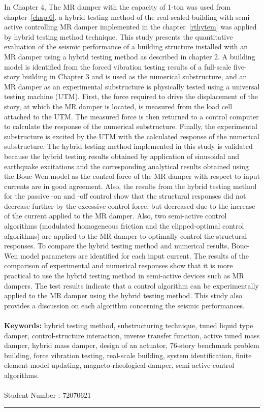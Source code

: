 In Chapter 4, The MR damper with the capacity of 1-ton was used from chapter~\ref{chap:6}, a hybrid testing method of the real-scaled building with semi-active controlling MR damper implemented in the chapter~\ref{rthytem} was applied by hybrid testing method technique. This study presents the quantitative evaluation of the seismic performance of a building structure installed with an MR damper using a hybrid testing method as described in chapter 2. A building model is identified from the forced vibration testing results of a full-scale five-story building in Chapter 3 and is used as the numerical substructure, and an MR damper as an experimental substructure is physically tested using a universal testing machine (UTM). First, the force required to drive the displacement of the story, at which the MR damper is located, is measured from the load cell attached to the UTM. The measured force is then returned to a control computer to calculate the response of the numerical substructure. Finally, the experimental substructure is excited by the UTM with the calculated response of the numerical substructure. The hybrid testing method implemented in this study is validated because the hybrid testing results obtained by application of sinusoidal and earthquake excitations and the corresponding analytical results obtained using the Bouc-Wen model as the control force of the MR damper with respect to input currents are in good agreement. Also, the results from the hybrid testing method for the passive -on and -off control show that the structural responses did not decrease further by the excessive control force, but decreased due to the increase of the current applied to the MR damper. Also, two semi-active control algorithms (modulated homogeneous friction and the clipped-optimal control algorithms) are applied to the MR damper to optimally control the structural responses. To compare the hybrid testing method and numerical results, Bouc-Wen model parameters are identified for each input current. The results of the comparison of experimental and numerical responses show that it is more practical to use the hybrid testing method in semi-active devices such as MR dampers. The test results indicate that a control algorithm can be experimentally applied to the MR damper using the hybrid testing method. This study also provides a discussion on each algorithm concerning the seismic performances.
\\
\\
{\large\textbf{Keywords:}}
hybrid testing method, substructuring technique, tuned liquid type damper, control-structure interaction, inverse transfer function, active tuned mass damper, hybrid mass damper, design of an actuator, 76-story benchmark problem building, force vibration testing, real-scale building, system identification, finite element model updating, magneto-rheological damper, semi-active control algorithms.
\\
\\
Student Number : 72070621\\
\noindent\rule[2pt]{\textwidth}{0.5pt}
